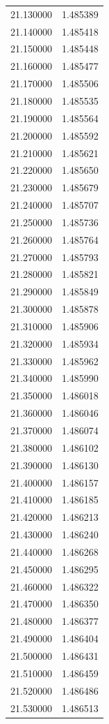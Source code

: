 \begin{tabular}{rr}
21.130000 & 1.485389 \\
21.140000 & 1.485418 \\
21.150000 & 1.485448 \\
21.160000 & 1.485477 \\
21.170000 & 1.485506 \\
21.180000 & 1.485535 \\
21.190000 & 1.485564 \\
21.200000 & 1.485592 \\
21.210000 & 1.485621 \\
21.220000 & 1.485650 \\
21.230000 & 1.485679 \\
21.240000 & 1.485707 \\
21.250000 & 1.485736 \\
21.260000 & 1.485764 \\
21.270000 & 1.485793 \\
21.280000 & 1.485821 \\
21.290000 & 1.485849 \\
21.300000 & 1.485878 \\
21.310000 & 1.485906 \\
21.320000 & 1.485934 \\
21.330000 & 1.485962 \\
21.340000 & 1.485990 \\
21.350000 & 1.486018 \\
21.360000 & 1.486046 \\
21.370000 & 1.486074 \\
21.380000 & 1.486102 \\
21.390000 & 1.486130 \\
21.400000 & 1.486157 \\
21.410000 & 1.486185 \\
21.420000 & 1.486213 \\
21.430000 & 1.486240 \\
21.440000 & 1.486268 \\
21.450000 & 1.486295 \\
21.460000 & 1.486322 \\
21.470000 & 1.486350 \\
21.480000 & 1.486377 \\
21.490000 & 1.486404 \\
21.500000 & 1.486431 \\
21.510000 & 1.486459 \\
21.520000 & 1.486486 \\
21.530000 & 1.486513 \\

\end{tabular}
